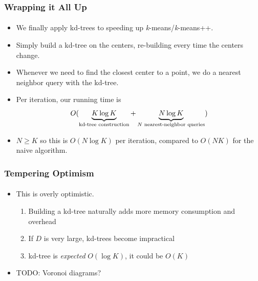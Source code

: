 \documentclass{beamer}                             %
\begin{document}
\begin{frame}
\frametitle{Wrapping it All Up}
\framesubtitle{}
\begin{itemize}
  \item We finally apply kd-trees to speeding
    up \textit{k}-means/\textit{k}-means++.
  \item Simply build a kd-tree on the centers,
    re-building every time the centers change.
  \item Whenever we need to find the closest center to a point,
    we do a nearest neighbor query with the kd-tree. \pause
  \item Per iteration, our running time is
    \[ O(\underbrace{K \log K}_{\text{kd-tree construction}} + 
         \underbrace{N \log K}_{\text{\( N \) nearest-neighbor queries}}) \]
  \item \( N \geq K \) so this is \( O(N \log K) \) per iteration,
    compared to \( O(N K) \) for the naive algorithm.
\end{itemize}
\end{frame}

\begin{frame}
\frametitle{Tempering Optimism}
\framesubtitle{}

\begin{itemize}
  \item This is overly optimistic.
    \begin{enumerate}
      \item Building a kd-tree naturally adds
        more memory consumption and overhead
      \item If \( D \) is very large, kd-trees become impractical
      \item kd-tree is \textit{expected} \(  O(\log K) \),
        it could be \( O(K) \)
    \end{enumerate}
  \item TODO: Voronoi diagrams?
\end{itemize}
\end{frame}
\end{document}
